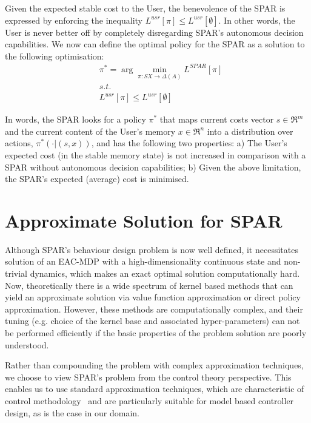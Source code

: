 \documentclass{msdm2012}
\begin{document}
Given the expected stable cost to the User, the benevolence of the
SPAR is expressed by enforcing the inequality $L^{usr}[\pi]\leq
L^{usr}[\emptyset]$. In other words, the User is never better off by
completely disregarding SPAR's autonomous decision
capabilities. We now can define the optimal policy
for the SPAR as a solution to the following optimisation:
\begin{eqnarray*}
&\pi^*=\arg\min\limits_{\pi:SX\rightarrow\Delta(A)}L^{SPAR}[\pi]\\
&\displaystyle{s.t.}\\
&L^{usr}[\pi]\leq L^{usr}[\emptyset]
\end{eqnarray*}

In words, the SPAR looks for a policy $\pi^*$ that maps current costs
vector $s\in\Re^m$ and the current content of the User's memory
$x\in\Re^n$ into a distribution over actions, $\pi^*(\cdot|(s,x))$,
and has the following two properties: a) The User's expected cost (in
the stable memory state) is not increased in comparison with a SPAR
without autonomous decision capabilities; b) Given the above
limitation, the SPAR's expected (average) cost is minimised.

\section{Approximate Solution for SPAR}\label{spar_sigma}
Although SPAR's behaviour design problem is now well defined, it
necessitates solution of an EAC-MDP with a high-dimensionality
continuous state and non-trivial dynamics, which makes an exact
optimal solution computationally hard. Now, theoretically there is a
wide spectrum of kernel based methods that can yield an approximate
solution via value function approximation or direct policy
approximation. However, these methods are computationally complex, and
their tuning (e.g. choice of the kernel base and associated
hyper-parameters) can not be performed efficiently if the basic
properties of the problem solution are poorly understood. %

Rather than compounding the problem with complex approximation
techniques, we choose to view SPAR's problem from the control theory
perspective. This enables us to use standard approximation techniques,
which are characteristic of control methodology~\cite{stengel_94_book}
and are particularly suitable for model based controller design, as is
the case in our domain.
\end{document}
